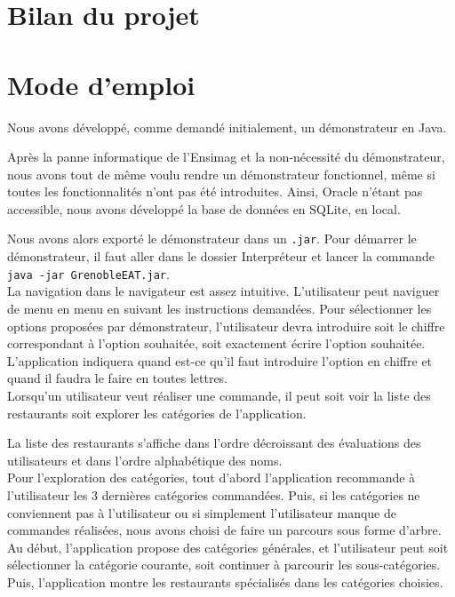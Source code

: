\documentclass[10pt, a4paper]{article}
\begin{document}
\section{Bilan du projet}
\section{Mode d'emploi}

Nous avons développé, comme demandé initialement, un démonstrateur en Java.

Après la panne informatique de l'Ensimag et la non-nécessité du démonstrateur, nous avons tout de même voulu 
rendre un démonstrateur fonctionnel, même si toutes les fonctionnalités n'ont pas été introduites. Ainsi, Oracle n'étant pas accessible, 
nous avons développé la base de données en SQLite, en local.

Nous avons alors exporté le démonstrateur dans un \texttt{.jar}. Pour démarrer le démonstrateur, il faut aller 
dans le dossier Interpréteur et lancer la commande \texttt{java -jar GrenobleEAT.jar}. \\


La navigation dans le navigateur est assez intuitive. L'utilisateur peut naviguer de menu en menu en suivant 
les instructions demandées. Pour sélectionner les options proposées par  démonstrateur, l'utilisateur devra 
introduire soit le chiffre correspondant à l'option souhaitée, soit exactement écrire l'option souhaitée.
L'application indiquera quand est-ce qu'il faut introduire l'option en chiffre et quand il faudra le faire en toutes lettres. \\

Lorsqu'un utilisateur veut réaliser une commande, il peut soit voir la liste des restaurants soit explorer les catégories de l'application.

La liste des restaurants s'affiche dans l'ordre décroissant des évaluations des utilisateurs et dans l'ordre alphabétique des noms. \\

Pour l'exploration des catégories, tout d'abord l'application recommande à l'utilisateur les 3 dernières catégories
commandées. Puis, si les catégories ne conviennent pas à l'utilisateur ou si simplement l'utilisateur manque de commandes 
réalisées, nous avons choisi de faire un parcours sous forme d'arbre. Au début, l'application propose des catégories générales, et 
l'utilisateur peut soit sélectionner la catégorie courante, soit continuer à parcourir les sous-catégories. Puis, l'application montre 
les restaurants spécialisés dans les catégories choisies. \\
\end{document}

